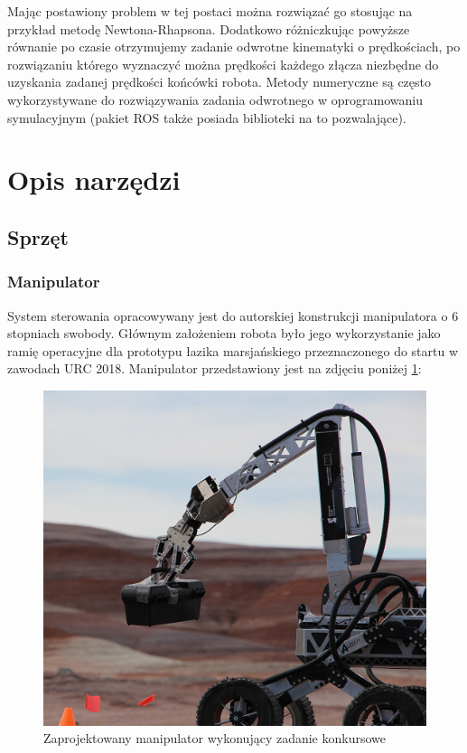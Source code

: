 \documentclass[a4paper, 12pt, twoside]{article}
\begin{document}
Mając postawiony problem w tej postaci można rozwiązać go stosując na przykład metodę Newtona-Rhapsona. Dodatkowo różniczkując powyższe równanie po czasie otrzymujemy zadanie odwrotne kinematyki o prędkościach, po rozwiązaniu którego wyznaczyć można prędkości każdego złącza niezbędne do uzyskania zadanej prędkości końcówki robota. Metody numeryczne są często wykorzystywane do rozwiązywania zadania odwrotnego w oprogramowaniu symulacyjnym (pakiet ROS także posiada biblioteki na to pozwalające).

\newpage
\vspace*{1.5 cm}
\section{Opis narzędzi} \label{tools}
\vspace{1.5 cm}

\subsection{Sprzęt}

\subsubsection{Manipulator}
System sterowania opracowywany jest do autorskiej konstrukcji manipulatora o 6 stopniach swobody. Głównym założeniem robota było jego wykorzystanie jako ramię operacyjne dla prototypu łazika marsjańskiego przeznaczonego do startu w zawodach URC 2018. Manipulator przedstawiony jest na zdjęciu poniżej \ref{fig:manipulator_photo}:

\begin{figure}[hbt!]
\centering
\includegraphics[width=0.5\linewidth]{images/manipulator_photo.png}
\caption{Zaprojektowany manipulator wykonujący zadanie konkursowe }
\label{fig:manipulator_photo}
\end{figure}
\end{document}
